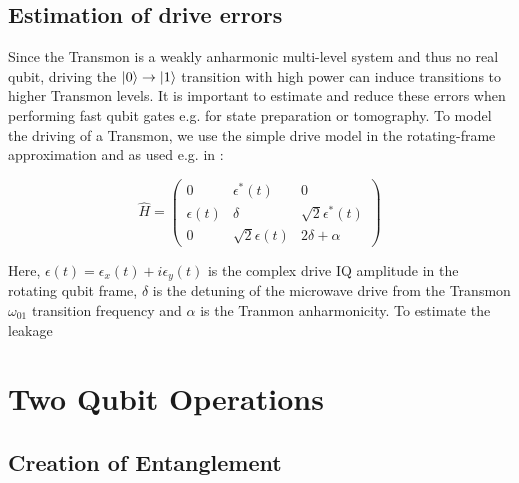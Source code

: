 \subsection{Estimation of drive errors}

Since the Transmon is a weakly anharmonic multi-level system and thus no real qubit, driving the $\left| 0 \right>\to\left| 1 \right>$ transition with high power can induce transitions to higher Transmon levels. It is important to estimate and reduce these errors when performing fast qubit gates e.g. for state preparation or tomography. To model the driving of a Transmon, we use the simple drive model in the rotating-frame approximation and as used e.g. in \cite{motzoi_simple_2009}:

\begin{equation}
\hat{H} = \left(
						 \begin{array}{ccc}
						0 & \epsilon^*(t) & 0 \\
						\epsilon(t) & \delta & \sqrt{2}\epsilon^*(t) \\
						0 & \sqrt{2}\epsilon(t) & 2\delta + \alpha
						\end{array}
					\right)
\end{equation}

Here, $\epsilon(t) = \epsilon_x(t)+i\epsilon_y(t)$ is the complex drive IQ amplitude in the rotating qubit frame, $\delta$ is the detuning of the microwave drive from the Transmon $\omega_{01}$ transition frequency and $\alpha$ is the Tranmon anharmonicity. To estimate the leakage

\section{Two Qubit Operations}

\subsection{Creation of Entanglement}

